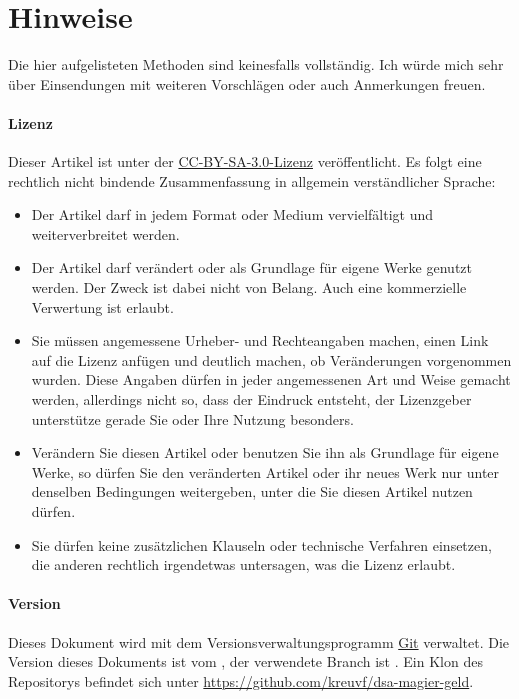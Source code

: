 \section{Hinweise}
Die hier aufgelisteten Methoden sind keinesfalls vollständig. Ich würde mich sehr über Einsendungen mit weiteren Vorschlägen oder auch Anmerkungen freuen.
\paragraph{Lizenz}
Dieser Artikel ist unter der \href{http://creativecommons.org/licenses/by-sa/3.0/de/}{CC-BY-SA-3.0-Lizenz} veröffentlicht. Es folgt eine rechtlich nicht bindende Zusammenfassung in allgemein verständlicher Sprache:
\begin{itemize}
	\item Der Artikel darf in jedem Format oder Medium vervielfältigt und weiterverbreitet werden.
	\item Der Artikel darf verändert oder als Grundlage für eigene Werke genutzt werden. Der Zweck ist dabei nicht von Belang. Auch eine kommerzielle Verwertung ist erlaubt.
	\item Sie müssen angemessene Urheber- und Rechteangaben machen, einen Link auf die Lizenz anfügen und deutlich machen, ob Veränderungen vorgenommen wurden. Diese Angaben dürfen in jeder angemessenen Art und Weise gemacht werden, allerdings nicht so, dass der Eindruck entsteht, der Lizenzgeber unterstütze gerade Sie oder Ihre Nutzung besonders.
	\item Verändern Sie diesen Artikel oder benutzen Sie ihn als Grundlage für eigene Werke, so dürfen Sie den veränderten Artikel oder ihr neues Werk nur unter denselben Bedingungen weitergeben, unter die Sie diesen Artikel nutzen dürfen.
	\item Sie dürfen keine zusätzlichen Klauseln oder technische Verfahren einsetzen, die anderen rechtlich irgendetwas untersagen, was die Lizenz erlaubt.
\end{itemize}

\paragraph{Version}
Dieses Dokument wird mit dem Versionsverwaltungsprogramm \href{http://git-scm.com/}{Git} verwaltet. Die Version dieses Dokuments ist \gitAbbrevHash{} vom \gitAuthorIsoDate, der verwendete Branch ist \gitBranch. Ein Klon des Repositorys befindet sich unter \url{https://github.com/kreuvf/dsa-magier-geld}.

